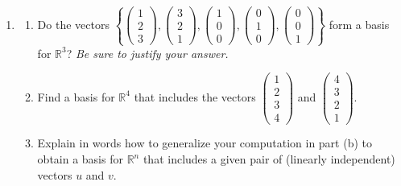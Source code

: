 \begin{enumerate}
\item
\begin{enumerate}\item Do the vectors $\left\{\begin{pmatrix}1\\2\\3\end{pmatrix},\begin{pmatrix}3\\2\\1\end{pmatrix},\begin{pmatrix}1\\0\\0\end{pmatrix},\begin{pmatrix}0\\1\\0\end{pmatrix},\begin{pmatrix}0\\0\\1\end{pmatrix}\right\}$ form a basis for ${\mathbb R}^3$? {\itshape Be sure to justify your answer.}
\item
Find a basis for ${\mathbb R}^4$ that includes the vectors $\begin{pmatrix}1\\2\\3\\4\end{pmatrix}$
and $\begin{pmatrix}4\\3\\2\\1\end{pmatrix}$.
\item Explain in words how to generalize your computation in part (b) to obtain a basis for ${\mathbb R}^n$ that includes a given pair of (linearly independent) vectors $u$ and $v$. 
\end{enumerate}


\end{enumerate}
